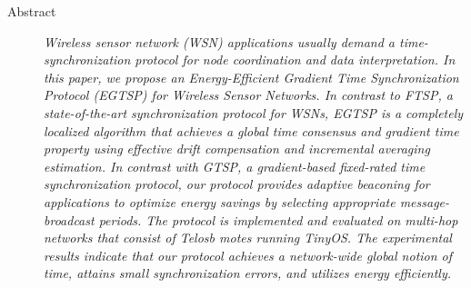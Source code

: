 \documentclass{res}
\begin{document}
\begin{resume}
\begin{itemize}
\begin{description}
		\item[Abstract]{\sl \small Wireless sensor network (WSN) applications usually demand a time-synchronization protocol for node coordination and data interpretation. In this paper, we propose an Energy-Efficient Gradient Time Synchronization Protocol (EGTSP) for Wireless Sensor Networks. In contrast to FTSP, a state-of-the-art synchronization protocol for WSNs, EGTSP is a completely localized algorithm that achieves a global time consensus and gradient time property using effective drift compensation and incremental averaging estimation. In contrast with GTSP, a gradient-based fixed-rated time synchronization protocol, our protocol provides adaptive beaconing for applications to optimize energy savings by selecting appropriate message-broadcast periods. The protocol is implemented and evaluated on multi-hop networks that consist of Telosb motes running TinyOS. The experimental results indicate that our protocol achieves a network-wide global notion of time, attains small synchronization errors, and utilizes energy efficiently.}
		\end{description}
  \end{itemize}

\vspace{0.2in} 

\end{resume}
\end{document}
